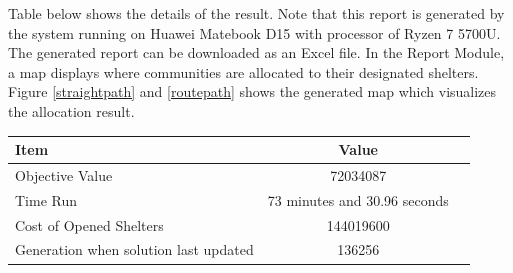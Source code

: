 	
	
	 Table below shows the details of the result. Note that this report is generated by the system running on Huawei Matebook D15 with processor of Ryzen 7 5700U. The generated report can be downloaded as an Excel file. In the Report Module, a map displays where communities are allocated to their designated shelters. Figure \ref{straightpath} and \ref{routepath} shows the generated map which visualizes the allocation result.
	
	\begin{table}[h!]
		\renewcommand{\arraystretch}{1.2} 
		\centering
		\begin{tabular}{p{10cm}cc}
			\hline
			\textbf{Item} & \textbf{Value} \\ \hline
			Objective Value & 72034087 \\ 
			Time Run  & 73 minutes and 30.96 seconds \\ 
			Cost of Opened Shelters & 144019600 \\ 
			Generation when solution last updated & 136256 \\ \hline
		\end{tabular}
	\end{table}
	
